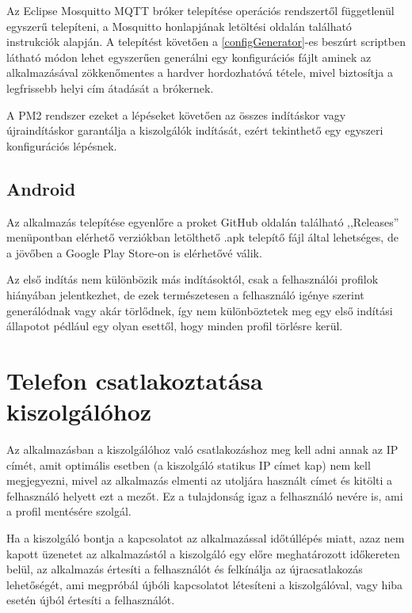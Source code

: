 \documentclass[]{thesis-ekf}
\theoremstyle{definition}
\theoremstyle{remark}
\begin{document}
Az Eclipse Mosquitto MQTT bróker telepítése operációs rendszertől függetlenül egyszerű telepíteni, a Mosquitto
honlapjának letöltési oldalán található instrukciók alapján. A telepítést követően a \ref{configGenerator}-es
beszúrt scriptben látható módon lehet egyszerűen generálni egy konfigurációs fájlt aminek az alkalmazásával
zökkenőmentes a hardver hordozhatóvá tétele, mivel biztosítja a legfrissebb helyi cím átadását a brókernek.

A PM2 rendszer ezeket a lépéseket követően az összes indításkor vagy újraindításkor garantálja a kiszolgálók
indítását, ezért tekinthető egy egyszeri konfigurációs lépésnek.


\subsection{Android}
Az alkalmazás telepítése egyenlőre a proket GitHub oldalán\cite{github}
található ,,Releases'' menüpontban elérhető verziókban letölthető .apk telepítő fájl által lehetséges, de a jövőben
a Google Play Store-on is elérhetővé válik.

Az első indítás nem különbözik más indításoktól, csak a felhasználói profilok hiányában jelentkezhet, de ezek
természetesen a felhasználó igénye szerint generálódnak vagy akár törlődnek, így nem különböztetek meg egy 
első indítási állapotot pédlául egy olyan esettől, hogy minden profil törlésre kerül.

\section{Telefon csatlakoztatása kiszolgálóhoz}
Az alkalmazásban a kiszolgálóhoz való csatlakozáshoz meg kell adni annak az IP címét, amit optimális esetben
(a kiszolgáló statikus IP címet kap) nem kell megjegyezni, mivel az alkalmazás  elmenti az utoljára használt címet
és kitölti a felhasználó helyett ezt a mezőt. Ez a tulajdonság igaz a felhasználó nevére is, ami a profil mentésére
szolgál.

Ha a kiszolgáló bontja a kapcsolatot az alkalmazással időtúllépés miatt, azaz nem kapott üzenetet az alkalmazástól
a kiszolgáló egy előre meghatározott időkereten belül, az alkalmazás értesíti a felhasználót és felkínálja
az újracsatlakozás lehetőségét, ami megpróbál újbóli kapcsolatot létesíteni a kiszolgálóval, vagy hiba esetén
újból értesíti a felhasználót.
\end{document}
